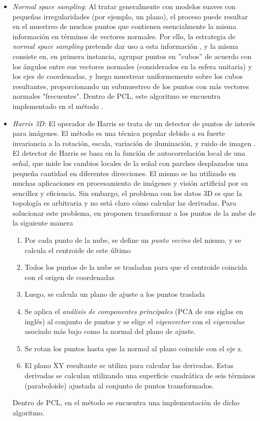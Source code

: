 \begin{itemize}
    \item \textit{Normal space sampling}: Al tratar generalmente con modelos suaves con pequeñas irregularidades (por ejemplo, un plano), el proceso puede resultar en el muestreo de muchos puntos que contienen esencialmente la misma información en términos de vectores normales. Por ello, la estrategia de \textit{normal space sampling} pretende dar uso a esta información \cite{rusinkiewicz2001}, y la misma consiste en, en primera instancia, agrupar puntos en ''cubos'' de acuerdo con los ángulos entre sus vectores normales (considerados en la esfera unitaria) y los ejes de coordenadas, y luego muestrear uniformemente sobre los cubos resultantes, proporcionando un submuestreo de los puntos con más vectores normales "frecuentes". Dentro de PCL, este algoritmo se encuentra implementado en el método .
    \item \textit{Harris 3D}: El operador de Harris \cite{harris1988} se trata de un detector de puntos de interés para imágenes. El método es una técnica popular debido a su fuerte invariancia a la rotación, escala, variación de iluminación, y ruido de imagen \cite{schmid2000}. El detector de Harris se basa en la función de autocorrelación local de una señal, que mide los cambios locales de la señal con parches desplazados una pequeña cantidad en diferentes direcciones. El mismo se ha utilizado en muchas aplicaciones en procesamiento de imágenes y visión artificial por su sencillez y eficiencia. Sin embargo, el problema con los datos 3D es que la topología es arbitraria y no está claro cómo calcular las derivadas. Para solucionar este problema, en \cite{sipiran2011} proponen transformar a los puntos de la nube de la siguiente manera
    \begin{enumerate}
        \item Por cada punto de la nube, se define un \textit{punto vecino} del mismo, y se calcula el centroide de este último
        \item Todos los puntos de la nube se trasladan para que el centroide coincida con el origen de coordenadas
        \item Luego, se calcula un plano de ajuste a los puntos traslada
        \item Se aplica el \textit{análisis de componentes principales} (PCA de sus siglas en inglés) \cite{jollife2016} al conjunto de puntos y se elige el \textit{eigenvector} con el \textit{eigenvalue} asociado más bajo como la normal del plano de ajuste.
        \item Se rotan los puntos hasta que la normal al plano coincide con el eje z.
        \item El plano XY resultante se utiliza para calcular las derivadas. Estas derivadas se calculan utilizando una superficie cuadrática de seis términos (paraboloide) ajustada al conjunto de puntos transformados.
    \end{enumerate}
    Dentro de PCL, en el método  se encuentra una implementación de dicho algoritmo.
\end{itemize}


